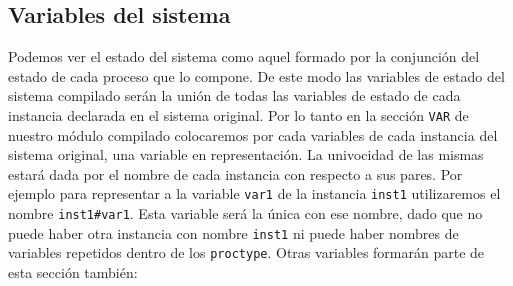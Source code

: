 \documentclass[pdftex,a4paper,12pt]{book}
\begin{document}
\subsection*{Variables del sistema}
Podemos ver el estado del sistema como aquel formado por la conjunci\'on del estado de cada proceso que lo compone. De este modo las variables de estado del sistema compilado ser\'an la uni\'on de todas las variables de estado de cada instancia declarada en el sistema original. Por lo tanto en la secci\'on \texttt{VAR} de nuestro m\'odulo compilado colocaremos por cada variables de cada instancia del sistema original, una variable en representaci\'on. La univocidad de las mismas estar\'a dada por el nombre de cada instancia con respecto a sus pares. Por ejemplo para representar a la variable \texttt{var1} de la instancia \texttt{inst1} utilizaremos el nombre \texttt{inst1\#var1}. Esta variable ser\'a la \'unica con ese nombre, dado que no puede haber otra instancia con nombre \texttt{inst1} ni puede haber nombres de variables repetidos dentro de los \texttt{proctype}. Otras variables formar\'an parte de esta secci\'on tambi\'en:
\end{document}
